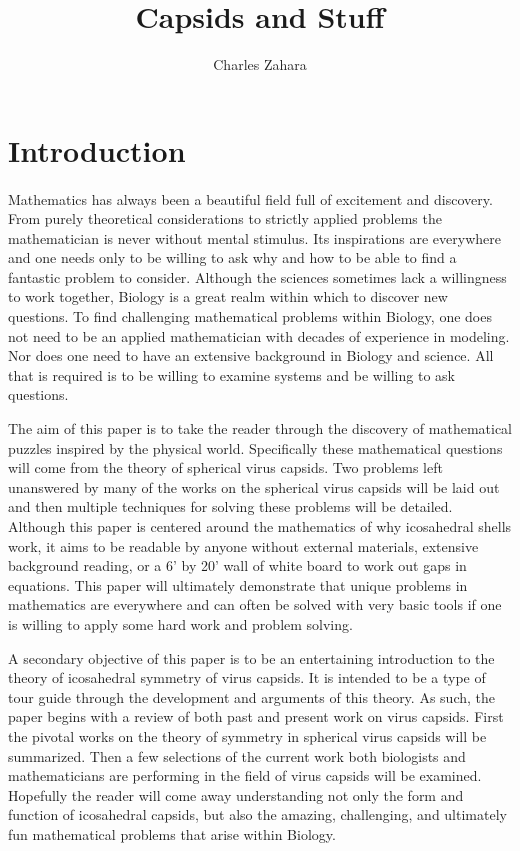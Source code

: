 \documentclass[12pt,letter]{article}
\begin{document}
\title{Capsids and Stuff}
\author{Charles Zahara}
\maketitle

\tableofcontents
\listoffigures

\section{Introduction}


\paragraph{}
Mathematics has always been a beautiful field full of excitement and discovery. From purely theoretical considerations to strictly applied problems the mathematician is never without mental stimulus. Its inspirations are everywhere and one needs only to be willing to ask why and how to be able to find a fantastic problem to consider. Although the sciences sometimes lack a willingness to work together, Biology is a great realm within which to discover new questions. To find challenging mathematical problems within Biology, one does not need to be an applied mathematician with decades of experience in modeling. Nor does one need to have an extensive background in Biology and science. All that is required is to be willing to examine systems and be willing to ask questions.

The aim of this paper is to take the reader through the discovery of mathematical puzzles inspired by the physical world. Specifically these mathematical questions will come from the theory of spherical virus capsids. Two problems left unanswered by many of the works on the spherical virus capsids will be laid out and then multiple techniques for solving these problems will be detailed. Although this paper is centered around the mathematics of why icosahedral shells work, it aims to be readable by anyone without external materials, extensive background reading, or a 6' by 20' wall of white board to work out gaps in equations. This paper will ultimately demonstrate that unique problems in mathematics are everywhere and can often be solved with very basic tools if one is willing to apply some hard work and problem solving.

A secondary objective of this paper is to be an entertaining introduction to the theory of icosahedral symmetry of virus capsids. It is intended to be a type of tour guide through the development and arguments of this theory. As such, the paper begins with a review of both past and present work on virus capsids. First the pivotal works on the theory of symmetry in spherical virus capsids will be summarized. Then a few selections of the current work both biologists and mathematicians are performing in the field of virus capsids will be examined. Hopefully the reader will come away understanding not only the form and function of icosahedral capsids, but also the amazing, challenging, and ultimately fun mathematical problems that arise within Biology. 
\end{document}
